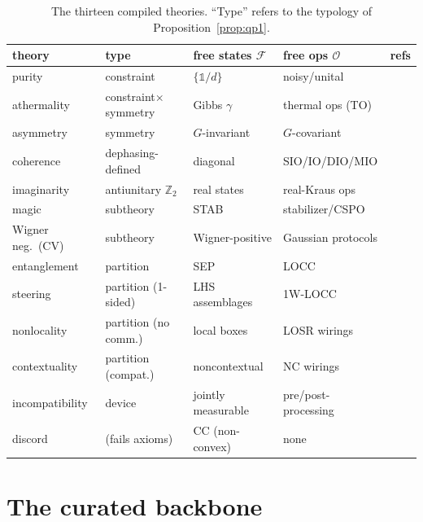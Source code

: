 \documentclass[11pt,a4paper]{article}
\theoremstyle{definition}
\newcommand{\id}{\mathbb{1}}
\newcommand{\F}{\mathcal{F}}
\newcommand{\Ops}{\mathcal{O}}
\begin{document}
\begin{table}[t]
\centering\small
\begin{tabular}{@{}lllll@{}}
\toprule
theory & type & free states $\F$ & free ops $\Ops$ & refs \\
\midrule
purity & constraint & $\{\id/d\}$ & noisy/unital & \cite{gour2015} \\
athermality & constraint$\times$symmetry & Gibbs $\gamma$ & thermal ops (TO) & \cite{brandao2013,horodeckioppenheim2013} \\
asymmetry & symmetry & $G$-invariant & $G$-covariant & \cite{gourspekkens2008,marvianspekkens2016} \\
coherence & dephasing-defined & diagonal & SIO/IO/DIO/MIO & \cite{baumgratz2014,streltsov2017rmp} \\
imaginarity & antiunitary $\mathbb{Z}_2$ & real states & real-Kraus ops & \cite{hickeygour2018,wu2021prl} \\
magic & subtheory & STAB & stabilizer/CSPO & \cite{veitch2014,seddoncampbell2019} \\
Wigner neg.\ (CV) & subtheory & Wigner-positive & Gaussian protocols & \cite{takagizhuang2018,marieisert2012} \\
entanglement & partition & SEP & LOCC & \cite{horodecki2009} \\
steering & partition (1-sided) & LHS assemblages & 1W-LOCC & \cite{wjd2007,gallegoaolita2015} \\
nonlocality & partition (no comm.) & local boxes & LOSR wirings & \cite{wolfe2020} \\
contextuality & partition (compat.) & noncontextual & NC wirings & \cite{amaral2018} \\
incompatibility & device & jointly measurable & pre/post-processing & \cite{bcz2020,heinosaari2016} \\
discord & (fails axioms) & CC (non-convex) & none & \cite{modi2012,ollivierzurek2001} \\
\bottomrule
\end{tabular}
\caption{The thirteen compiled theories. ``Type'' refers to the typology of
Proposition~\ref{prop:qp1}.}
\label{tab:theories}
\end{table}

\section{The curated backbone}\label{sec:backbone}
\end{document}
